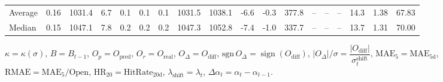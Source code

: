 \begin{threeparttable}
{\begin{tabular}{lrrrrrrrrrrrrrrrrr}
Average &     0.16 & 1031.4 &               6.7 &               0.1 &                0.1 &                0.1 & 1031.5 & 1038.1 &       -6.6 &                     -0.3 &               377.8 &         -- &        -- &             -- &             14.3 &            1.38 &                  67.83 \\
 Median &     0.15 & 1047.1 &               7.8 &               0.2 &                0.2 &                0.2 & 1047.3 & 1052.8 &       -7.4 &                     -1.0 &               337.7 &         -- &        -- &             -- &             13.7 &            1.31 &                  70.00 \\
\bottomrule
\end{tabular}
}
\begin{tablenotes}\footnotesize
\item $\kappa=\kappa(\sigma)$, $B=B_{t-1}$, $O_p=O_{\text{pred}}$, $O_r=O_{\text{real}}$, $O_\Delta=O_{\text{diff}}$, $\mathrm{sgn}\,O_\Delta=\operatorname{sign}(O_{\text{diff}})$, $|O_\Delta|/\sigma=\dfrac{|O_{\text{diff}}|}{\sigma_t^{\text{shift}}}$, $\mathrm{MAE}_5=\mathrm{MAE}_{5\text{d}}$, $\mathrm{RMAE}= \mathrm{MAE}_5 / \text{Open}$, $\mathrm{HR}_{20}=\mathrm{HitRate}_{20\text{d}}$, 
$\lambda_{\text{shift}}=\lambda_t$, 
$\Delta\alpha_t=\alpha_t-\alpha_{t-1}$.
\end{tablenotes}
\end{threeparttable}
\endgroup

